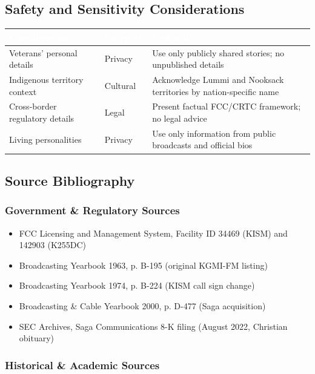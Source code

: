 \documentclass[11pt,letterpaper]{article}
\newcommand{\tableheader}[1]{\textbf{\sffamily\textcolor{white}{#1}}}
\begin{document}
\subsection{Safety and Sensitivity Considerations}

\begin{center}
\begin{tabularx}{\textwidth}{L{3.5cm}L{2.5cm}X}
\toprule
{}
\tableheader{Consideration} & \tableheader{Category} & \tableheader{Protocol} \\
\midrule
Veterans' personal details & Privacy & Use only publicly shared stories; no unpublished details \\
Indigenous territory context & Cultural & Acknowledge Lummi and Nooksack territories by nation-specific name \\
Cross-border regulatory details & Legal & Present factual FCC/CRTC framework; no legal advice \\
Living personalities & Privacy & Use only information from public broadcasts and official bios \\
\bottomrule
\end{tabularx}
\end{center}

\subsection{Source Bibliography}

\subsubsection{Government \& Regulatory Sources}

\begin{itemize}[nosep]
\item FCC Licensing and Management System, Facility ID 34469 (KISM) and 142903 (K255DC)
\item Broadcasting Yearbook 1963, p. B-195 (original KGMI-FM listing)
\item Broadcasting Yearbook 1974, p. B-224 (KISM call sign change)
\item Broadcasting \& Cable Yearbook 2000, p. D-477 (Saga acquisition)
\item SEC Archives, Saga Communications 8-K filing (August 2022, Christian obituary)
\end{itemize}

\subsubsection{Historical \& Academic Sources}
\end{document}
